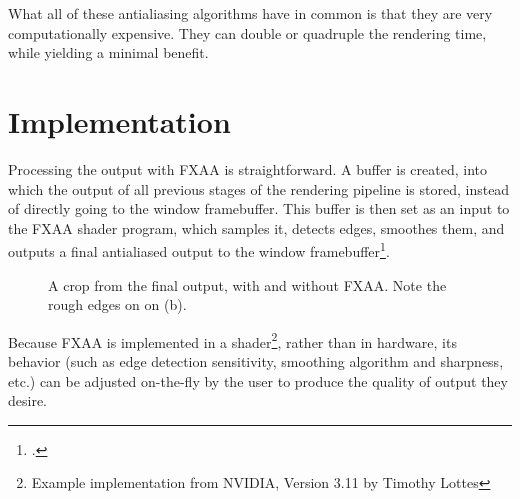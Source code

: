 \documentclass[11pt, oneside]{report}
\begin{document}
What all of these antialiasing algorithms have in common is that they are very computationally expensive. They can double or quadruple the rendering time, while yielding a minimal benefit.

\section{Implementation}
Processing the output with \gls{FXAA} is straightforward. A buffer is created, into which the output of all previous stages of the rendering pipeline is stored, instead of directly going to the window framebuffer. This buffer is then set as an input to the \gls{FXAA} \gls{shader} program, which samples it, detects edges, smoothes them, and outputs a final antialiased output to the window framebuffer\footcite{nvidia-fxaa}.

\begin{figure}[!htbp]
  \centering
  \hfill
  \caption{A crop from the final output, with and without FXAA. Note the rough edges on on (b).}
\end{figure}

Because \gls{FXAA} is implemented in a shader\footnote{Example implementation from NVIDIA, Version 3.11 by Timothy Lottes}, rather than in hardware, its behavior (such as edge detection sensitivity, smoothing algorithm and sharpness, etc.) can be adjusted on-the-fly by the user to produce the quality of output they desire.
\end{document}
